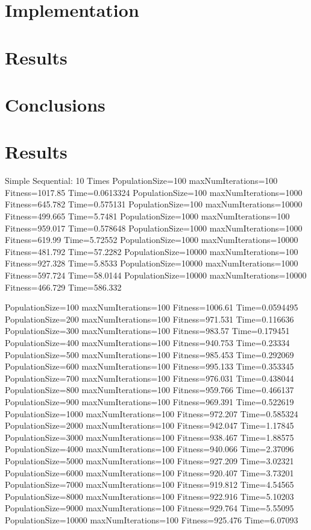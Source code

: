 \documentclass[10pt,letterpaper]{article}
\begin{document}
\section{Implementation}

\section{Results}

\section{Conclusions}




\section{Results}
Simple Sequential: 10 Times
PopulationSize=100 maxNumIterations=100 Fitness=1017.85 Time=0.0613324
PopulationSize=100 maxNumIterations=1000 Fitness=645.782 Time=0.575131
PopulationSize=100 maxNumIterations=10000 Fitness=499.665 Time=5.7481
PopulationSize=1000 maxNumIterations=100 Fitness=959.017 Time=0.578648
PopulationSize=1000 maxNumIterations=1000 Fitness=619.99 Time=5.72552
PopulationSize=1000 maxNumIterations=10000 Fitness=481.792 Time=57.2282
PopulationSize=10000 maxNumIterations=100 Fitness=927.328 Time=5.8533
PopulationSize=10000 maxNumIterations=1000 Fitness=597.724 Time=58.0144
PopulationSize=10000 maxNumIterations=10000 Fitness=466.729 Time=586.332


PopulationSize=100 maxNumIterations=100 Fitness=1006.61 Time=0.0594495
PopulationSize=200 maxNumIterations=100 Fitness=971.531 Time=0.116636
PopulationSize=300 maxNumIterations=100 Fitness=983.57 Time=0.179451
PopulationSize=400 maxNumIterations=100 Fitness=940.753 Time=0.23334
PopulationSize=500 maxNumIterations=100 Fitness=985.453 Time=0.292069
PopulationSize=600 maxNumIterations=100 Fitness=995.133 Time=0.353345
PopulationSize=700 maxNumIterations=100 Fitness=976.031 Time=0.438044
PopulationSize=800 maxNumIterations=100 Fitness=959.766 Time=0.466137
PopulationSize=900 maxNumIterations=100 Fitness=969.391 Time=0.522619
PopulationSize=1000 maxNumIterations=100 Fitness=972.207 Time=0.585324
PopulationSize=2000 maxNumIterations=100 Fitness=942.047 Time=1.17845
PopulationSize=3000 maxNumIterations=100 Fitness=938.467 Time=1.88575
PopulationSize=4000 maxNumIterations=100 Fitness=940.066 Time=2.37096
PopulationSize=5000 maxNumIterations=100 Fitness=927.209 Time=3.02321
PopulationSize=6000 maxNumIterations=100 Fitness=920.407 Time=3.73201
PopulationSize=7000 maxNumIterations=100 Fitness=919.812 Time=4.54565
PopulationSize=8000 maxNumIterations=100 Fitness=922.916 Time=5.10203
PopulationSize=9000 maxNumIterations=100 Fitness=929.764 Time=5.55095
PopulationSize=10000 maxNumIterations=100 Fitness=925.476 Time=6.07093
\end{document}
